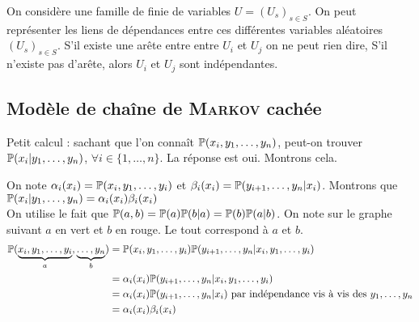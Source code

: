 On considère une famille de finie de variables $U = (U_s)_{s \in S}$. On peut représenter les liens de dépendances entre ces différentes variables aléatoires $(U_s)_{s \in S}$. S'il existe une arête entre entre $U_i$ et $U_j$ on ne peut rien dire, S'il n'existe pas d'arête, alors $U_i$ et $U_j$ sont indépendantes.

\subsection{Modèle de chaîne de \textsc{Markov} cachée}

Petit calcul : sachant que l'on connaît $\P(x_i, y_1, \ldots, y_n)$, peut-on trouver $\P(x_i \vert y_1, \ldots, y_n)$, $\forall i\in \{1,\ldots,n\}$. La réponse est oui. Montrons cela.


On note $\alpha_i(x_i) = \P(x_i, y_1, \ldots, y_i)$ et $\beta_i(x_i) = \P(y_{i+1}, \ldots, y_n \vert x_i)$.
Montrons que $\P(x_i \vert y_1,\ldots, y_n) = \alpha_i(x_i)\beta_i(x_i)$ \\

On utilise le fait que $\P(a,b) = \P(a) \P(b \vert a) = \P(b) \P(a \vert b)$. On note sur le graphe suivant $a$ en vert et $b$ en rouge. Le tout correspond à $a$ et $b$.
\begin{equation*}
\begin{split}
  \P( \underbrace{x_i, y_1,\ldots,y_i}_{a},\underbrace{\ldots,y_n}_b) &= \P(x_i,y_1,\ldots,y_i) \P(y_{i+1},\ldots,y_n \vert x_i, y_1,\ldots,y_i) \\
  &= \alpha_i(x_i)  \P(y_{i+1},\ldots,y_n \vert x_i, y_1,\ldots,y_i) \\
  &= \alpha_i(x_i)  \P(y_{i+1},\ldots,y_n \vert x_i) \text{ par indépendance vis à vis des } y_1,\ldots,y_n\\
  &= \alpha_i(x_i) \beta_i(x_i)  \\
\end{split}
\end{equation*}

